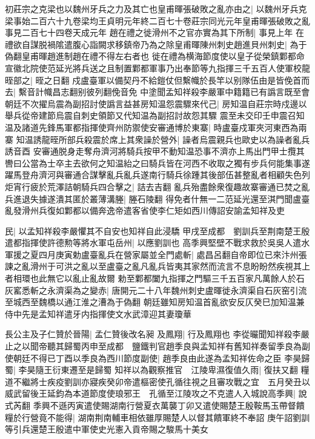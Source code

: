 初莊宗之克梁也以魏州牙兵之力及其亡也皇甫暉張破敗之亂亦由之|{
	以魏州牙兵克梁事始二百六十九卷梁均王貞明元年終二百七十卷莊宗同光元年皇甫暉張破敗之亂事見二百七十四卷天成元年}
趙在禮之徙滑州不之官亦實為其下所制|{
	事見上年}
在禮欲自謀脱禍隂遣腹心詣闕求移鎮帝乃為之除皇甫暉陳州刺史趙進貝州刺史|{
	為于偽翻皇甫暉趙進制趙在禮不得左右者也}
徙在禮為横海節度使以皇子從榮鎮鄴都命宣徽北院使范延光將兵送之且制置鄴都軍事乃出奉節等九指揮三千五百人使軍校龍晊部之|{
	晊之日翻}
戍盧臺軍以備契丹不給鎧仗但繫幟於長竿以别隊伍由是皆俛首而去|{
	繫音計幟昌志翻别彼列翻俛音免}
中塗聞孟知祥殺李嚴軍中籍籍已有譌言既至會朝廷不次擢烏震為副招討使譌言益甚房知温怨震驟來代己|{
	房知温自莊宗時戍邊以舉兵從帝建節烏震自刺史領節又代知温為副招討故怨其驟}
震至未交印壬申震召知温及諸道先鋒馬軍都指揮使齊州防禦使安審通博於東寨|{
	時盧臺戍軍夾河東西為兩寨}
知温誘龍晊所部兵殺震於席上其衆譟於營外|{
	譟者烏震親兵也歐史以為譟者亂兵誘音酉}
安審通脱身走奪舟濟河將騎兵按甲不動知温恐事不濟亦上馬出門甲士攬其轡曰公當為士卒主去欲何之知温紿之曰騎兵皆在河西不收取之獨有步兵何能集事遂躍馬登舟濟河與審通合謀擊亂兵亂兵遂南行騎兵徐踵其後部伍甚整亂者相顧失色列炬宵行疲於荒澤詰朝騎兵四合擊之|{
	詰去吉翻}
亂兵殆盡餘衆復趣故寨審通已焚之亂兵進退失據遂潰其匿於叢薄溝塍|{
	塍石陵翻}
得免者什無一二范延光還至淇門聞盧臺亂發滑州兵復如鄴都以備奔逸帝遣客省使李仁矩如西川傳詔安諭孟知祥及吏

民|{
	以孟知祥殺李嚴懼其不自安也知祥自此浸驕}
甲戌至成都　劉訓兵至荆南楚王殷遣都指揮使許德勲等將水軍屯岳州|{
	以應劉訓也}
高季興堅壁不戰求救於吳吳人遣水軍援之夏四月庚寅勅盧臺亂兵在營家屬並全門處斬|{
	處昌呂翻自帝即位已來汴州張諫之亂滑州于可洪之亂以至盧臺之亂凡亂兵皆夷其家然而流言不息盼盼然疾視其上者相環也此無它以亂止亂故爾}
勅至鄴都闔九指揮之門驅三千五百家凡萬餘人於石灰窰悉斬之永濟渠為之變赤|{
	唐開元二十八年魏州刺史盧暉徙永濟渠自石灰窑引流至城西至魏橋以通江淮之漕為于偽翻}
朝廷雖知房知温首亂欲安反仄癸巳加知温兼侍中先是孟知祥遣牙内指揮使文水武漳迎其妻瓊華

長公主及子仁贊於晉陽|{
	孟仁贊後改名昶}
及鳳翔|{
	行及鳳翔也}
李從曮聞知祥殺李嚴止之以聞帝聽其歸蜀丙申至成都　鹽鐵判官趙季良與孟知祥有舊知祥奏留季良為副使朝廷不得已丁酉以季良為西川節度副使|{
	趙季良由此遂為孟知祥佐命之臣}
李昊歸蜀|{
	李昊隨王衍東遷至是歸蜀}
知祥以為觀察推官　江陵卑濕復值久雨|{
	復扶又翻}
糧道不繼將士疾疫劉訓亦寢疾癸卯帝遣樞密使孔循往視之且審攻戰之宜　五月癸丑以威武留後王延鈞為本道節度使琅邪王　孔循至江陵攻之不克遣人入城說高季興|{
	說式芮翻}
季興不遜丙寅遣使賜湖南行營夏衣萬襲丁卯又遣使賜楚王殷鞍馬玉帶督饋糧於行營竟不能得|{
	湖南荆南輔車相依雖厚賜楚人以督其饋軍終不奉詔}
庚午詔劉訓等引兵還楚王殷遣中軍使史光憲入貢帝賜之駿馬十美女

